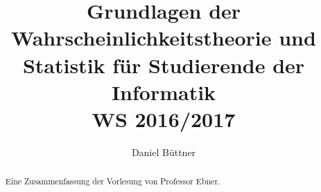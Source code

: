 \documentclass[titlepage]{article}
\begin{document}
\author{Daniel Büttner}
\title{Grundlagen der Wahrscheinlichkeitstheorie und Statistik für Studierende der Informatik \\ WS 2016/2017 }
\maketitle
\renewcommand{\abstractname}{Executive Summary}

\begin{abstract}
Eine Zusammenfassung der Vorlesung von Professor Ebner.
\end{abstract}

\renewcommand{\contentsname}{Inhaltsverzeichnis}
\tableofcontents
\newpage
\end{document}
